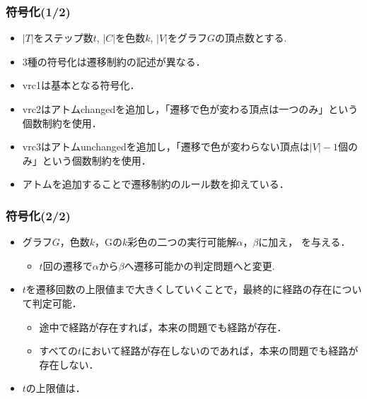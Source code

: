 \documentclass[dvipdfmx,11pt]{beamer}
\begin{document}

\begin{frame}\frametitle{符号化(1/2)}

  \begin{itemize}
    \item $|T|$をステップ数$t$, $|C|$を色数$k$, $|V|$をグラフ$G$の頂点数とする.
    
  \end{itemize}

  \begin{table}[t]
    \centering
    
  \end{table}

  \begin{itemize}
    \item 3種の符号化は遷移制約の記述が異なる．
    \item vrc1は基本となる符号化．
    \item vrc2はアトムchangedを追加し，「遷移で色が変わる頂点は一つのみ」という個数制約を使用．
    \item vrc3はアトムunchangedを追加し，「遷移で色が変わらない頂点は$|V|-1$個のみ」という個数制約を使用．
    \item アトムを追加することで遷移制約のルール数を抑えている．
  \end{itemize}

\end{frame}


\begin{frame}\frametitle{符号化(2/2)}

  \begin{itemize}
    \item グラフ$G$，色数$k$，Gの$k$彩色の二つの実行可能解$\alpha$，$\beta$に加え， を与える．
    \begin{itemize}
      \item $t$回の遷移で$\alpha$から$\beta$へ遷移可能かの判定問題へと変更. 
    \end{itemize}
    \item $t$を遷移回数の上限値まで大きくしていくことで，最終的に経路の存在について判定可能．
    \begin{itemize}
      \item 途中で経路が存在すれば，本来の問題でも経路が存在．
      \item すべての$t$において経路が存在しないのであれば，本来の問題でも経路が存在しない．
    \end{itemize}
    \item $t$の上限値は．
  \end{itemize}

  
\end{frame}
\end{document}
